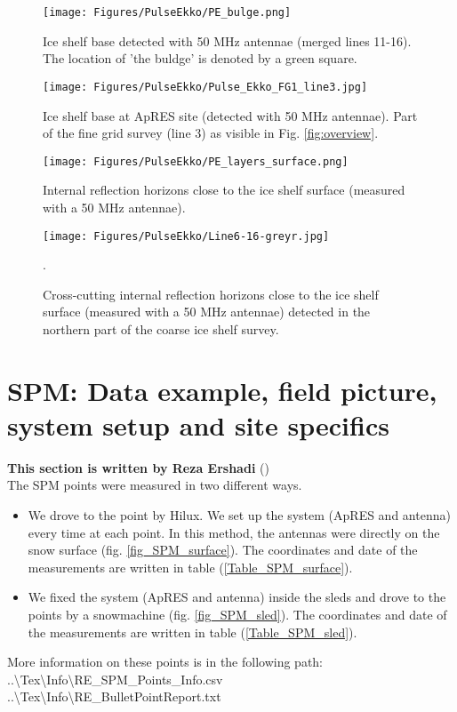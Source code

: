 \documentclass[a4paper,12pt]{article}
\begin{document}
\begin{figure}[H]
\texttt{[image: Figures/PulseEkko/PE\_bulge.png]}
\caption{Ice shelf base detected with 50 MHz antennae (merged lines 11-16). The location of 'the buldge' is denoted by a green square.}
\label{fig_PE_bulge}
\end{figure}
\begin{figure}[H]
\texttt{[image: Figures/PulseEkko/Pulse\_Ekko\_FG1\_line3.jpg]}
\caption{Ice shelf base at ApRES site (detected with 50 MHz antennae). Part of the fine grid survey (line 3) as visible in Fig. \ref{fig:overview}.}
\label{fig_PE_ApRES_site}
\end{figure}
\begin{figure}[H]
\texttt{[image: Figures/PulseEkko/PE\_layers\_surface.png]}
\caption{Internal reflection horizons close to the ice shelf surface (measured with a 50 MHz antennae).}
\label{fig_IRH1}
\end{figure}
\begin{figure}[H]
\texttt{[image: Figures/PulseEkko/Line6-16-greyr.jpg]}
\caption{Cross-cutting internal reflection horizons close to the ice shelf surface (measured with a 50 MHz antennae) detected in the northern part of the coarse ice shelf survey.}.
\label{fig_IRH2}
\end{figure}
\pagebreak
\section{SPM: Data example, field picture, system setup and site specifics}
\label{SecSPM}
\textbf{This section is written by Reza Ershadi}
(\href{mailto:mohammadreza.ershadi@uni-tuebingen.de}{\color{blue}{Email Me}})\\

The SPM points were measured in two different ways.
\begin{itemize}
\item We drove to the point by
Hilux. We set up the system (ApRES and antenna) every time at each point. In
this method, the antennas were directly on the snow surface (fig. \ref{fig_SPM_surface}). The
coordinates and date of the measurements are written in table (\ref{Table_SPM_surface}).
\item We fixed the system (ApRES and antenna) inside the sleds and drove to the points by a
snowmachine (fig. \ref{fig_SPM_sled}). The coordinates and date of the measurements are written in
table (\ref{Table_SPM_sled}).
\end{itemize}
More information on these points is in the following path:\\
..\textbackslash Tex\textbackslash Info\textbackslash RE\_SPM\_Points\_Info.csv\\
..\textbackslash Tex\textbackslash Info\textbackslash RE\_BulletPointReport.txt
\end{document}
